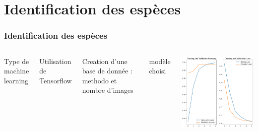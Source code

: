 \documentclass{beamer}
\begin{document}
\section{Identification des espèces}

\begin{frame}
	\frametitle{Identification des espèces}
	\begin{columns}
		Type de machine learning
		
		Utilisation de Tensorflow
	
		Creation d'une base de donnée : methodo et nombre d'images
	
		modèle choisi
	
		\centering
		\includegraphics[scale=0.35]{train.png}
	\end{columns}
	
\end{frame}
\end{document}
